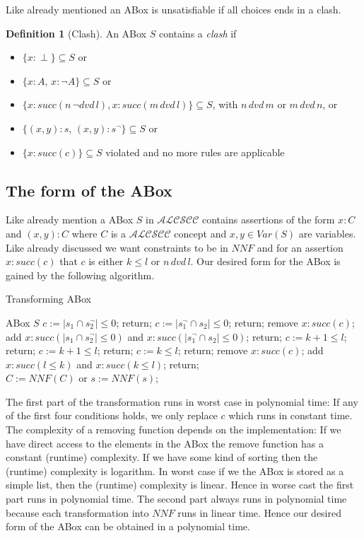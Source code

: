 \documentclass[a4paper,11pt]{scrartcl}
\theoremstyle{break}
\theoremstyle{definition}
\newtheorem{mydef}{Definition}
\begin{document}
Like already mentioned an ABox is unsatisfiable if all choices ends in a clash.
\begin{mydef}[Clash]
An ABox $S$ contains a \textit{clash} if
\begin{itemize}
\item $\{x:\perp\}\subseteq S$ or
\item $\{x:A,\,x:\neg A\}\subseteq S$ or
\item $\{x:succ(n\,\neg dvd\,l),x:succ(m\,dvd\,l)\}\subseteq S$, with $n\,dvd\,m$ or $m\,dvd\,n$, or
\item $\{(x,y):s,\,(x,y):s^\neg\}\subseteq S$ or
\item $\{x:succ(c)\}\subseteq S$ violated and no more rules are applicable
\end{itemize}
\end{mydef}
\subsection{The form of the ABox}
Like already mention a ABox $S$ in $\mathcal{ALCSCC}$ contains assertions of the form $x:C$ and $(x,y):C$ where $C$ is a $\mathcal{ALCSCC}$ concept and $x,y\in Var(S)$ are variables. Like already discussed we want constraints to be in $NNF$ and for an assertion $x:succ(c)$ that $c$ is either $k\leq l$ or $n\,dvd\,l$.
Our desired form for the ABox is gained by the following algorithm.
\begin{algorithm}[H] \caption{Transforming ABox}
\begin{algorithmic}[l]
\State ABox $S$
\State $c:=|s_1\cap s_2^\neg|\leq 0$; return;
\EndIf
{}
\State $c:=|s_1^\neg\cap s_2|\leq 0$; return;
\EndIf
{}
\State remove $x:succ(c)$;
\State add $x:succ(|s_1\cap s_2^\neg|\leq 0)$ and $x:succ(|s_1^\neg\cap s_2|\leq 0)$; return;
\EndIf
{}
\State $c:=k +1\leq l$; return;
\EndIf
{}
\State $c:=k +1\leq l$; return;
\EndIf
{}
\State $c:=k\leq l$; return;
\EndIf
{}
\State remove $x:succ(c)$;
\State add $x:succ(l\leq k)$ and $x:succ(k\leq l)$; return;
\EndIf
\EndFor\\
\State $C:=NNF(C)$ or $s:=NNF(s)$;
\EndFor
\end{algorithmic}
\end{algorithm}
The first part of the transformation runs in worst case in polynomial time: If any of the first four conditions holds, we only replace $c$ which runs in constant time.  The complexity of a removing function depends on the implementation: If we have direct access to the elements in the ABox the remove function has a constant (runtime) complexity. If we have some kind of sorting then the (runtime) complexity is logarithm. In worst case if we the ABox is stored as a simple list, then the (runtime) complexity is linear. Hence in worse cast the first part runs in polynomial time. The second part always runs in polynomial time because each transformation into $NNF$ runs in linear time. Hence our desired form of the ABox can be obtained in a polynomial time.
\end{document}
